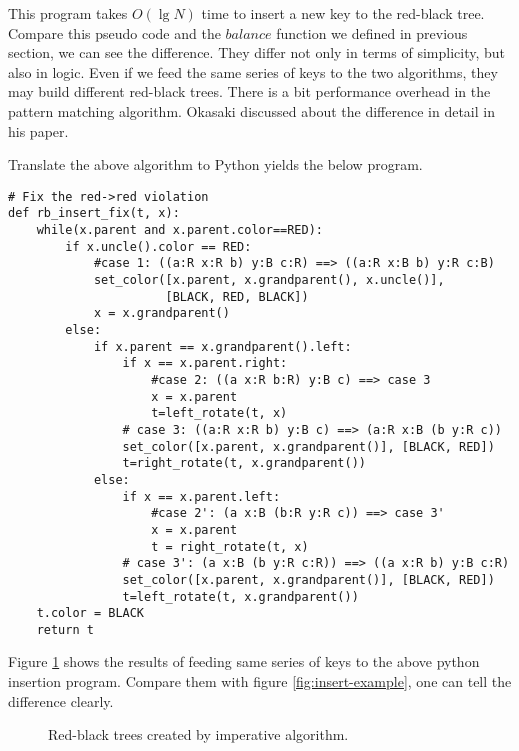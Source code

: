 \documentclass{article}
\begin{document}
This program takes $O(\lg N)$ time to insert a new key to the red-black tree.
Compare this pseudo code and the $balance$ function we defined in previous
section, we can see the difference. They differ not only in terms of
simplicity, but also in logic. Even if we feed the same series of keys to
the two algorithms, they may build different red-black trees. There
is a bit performance overhead in the pattern matching algorithm.
Okasaki discussed about the difference in detail in his paper\cite{okasaki}.

Translate the above algorithm to Python yields the below program.

\begin{lstlisting}
# Fix the red->red violation
def rb_insert_fix(t, x):
    while(x.parent and x.parent.color==RED):
        if x.uncle().color == RED:
            #case 1: ((a:R x:R b) y:B c:R) ==> ((a:R x:B b) y:R c:B)
            set_color([x.parent, x.grandparent(), x.uncle()],
                      [BLACK, RED, BLACK])
            x = x.grandparent()
        else:
            if x.parent == x.grandparent().left:
                if x == x.parent.right:
                    #case 2: ((a x:R b:R) y:B c) ==> case 3
                    x = x.parent
                    t=left_rotate(t, x)
                # case 3: ((a:R x:R b) y:B c) ==> (a:R x:B (b y:R c))
                set_color([x.parent, x.grandparent()], [BLACK, RED])
                t=right_rotate(t, x.grandparent())
            else:
                if x == x.parent.left:
                    #case 2': (a x:B (b:R y:R c)) ==> case 3'
                    x = x.parent
                    t = right_rotate(t, x)
                # case 3': (a x:B (b y:R c:R)) ==> ((a x:R b) y:B c:R)
                set_color([x.parent, x.grandparent()], [BLACK, RED])
                t=left_rotate(t, x.grandparent())
    t.color = BLACK
    return t
\end{lstlisting}

Figure \ref{fig:imperative-insert} shows the results of feeding same
series of keys to the above python insertion program. Compare them with
figure \ref{fig:insert-example}, one can tell the difference clearly.

\begin{figure}[htbp]
   \centering
   \caption{Red-black trees created by imperative algorithm.}
   \label{fig:imperative-insert}
\end{figure}
\end{document}

